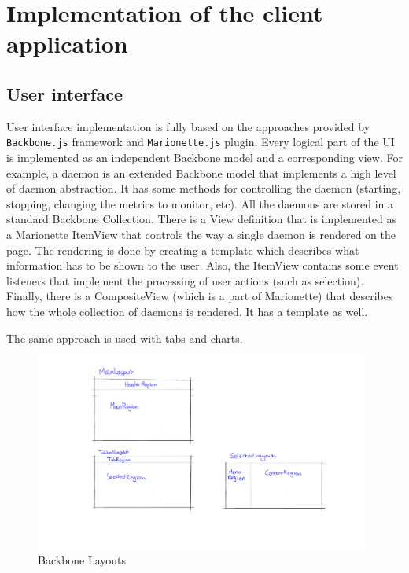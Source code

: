 \documentclass{l3proj}
\begin{document}

\section{Implementation of the client application}

\subsection{User interface}

User interface implementation is fully based on the approaches provided by \texttt{Backbone.js} framework and \texttt{Marionette.js} plugin. Every logical part of the UI is implemented as an independent Backbone model and a corresponding view. For example, a daemon is an extended Backbone model that implements a high level of daemon abstraction. It has some methods for controlling the daemon (starting, stopping, changing the metrics to monitor, etc). All the daemons are stored in a standard Backbone Collection. There is a View definition that is implemented as a Marionette ItemView that controls the way a single daemon is rendered on the page. The rendering is done by creating a template which describes what information has to be shown to the user. Also, the ItemView contains some event listeners that implement the processing of user actions (such as selection). Finally, there is a CompositeView (which is a part of Marionette) that describes how the whole collection of daemons is rendered. It has a template as well.

The same approach is used with tabs and charts.

\begin{figure}[H]
\centering
\includegraphics[width=110mm]{Concept_Designs/BackboneLayouts.png}
\caption{Backbone Layouts}
\label{fig:BackboneLayouts}
\end{figure}
\end{document}
